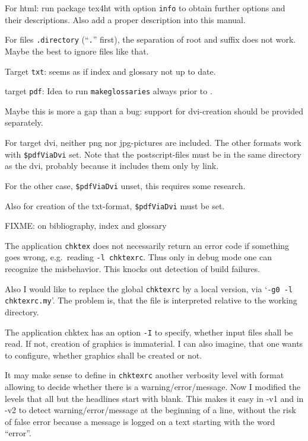 For html: run package tex4ht with option \texttt{info} 
to obtain further options and their descriptions. 
Also add a proper description into this manual. 

For files \texttt{.directory} (``\texttt{.}'' first), 
the separation of root and suffix does not work. 
Maybe the best to ignore files like that. 

Target \texttt{txt}: seems as if index and glossary not up to date. 

target \texttt{pdf}: Idea to run \texttt{makeglossaries} 
always prior to \lualatex. 

Maybe this is more a gap than a bug: 
support for dvi-creation should be provided separately. 

For target dvi, 
neither png nor jpg-pictures are included. 
The other formats work with \texttt{\$pdfViaDvi} set. 
Note that the postscript-files must be in the same directory 
as the dvi, probably because it includes them 
only by link. 

For the other case, \texttt{\$pdfViaDvi} unset, this requires some research. 

Also for creation of the txt-format, 
\texttt{\$pdfViaDvi} must be set. 

FIXME\@: on bibliography, index and glossary 

The application \texttt{chktex} does not necessarily return an error code 
if something goes wrong, e.g.~reading \texttt{-l chktexrc}. 
Thus only in debug mode one can recognize the misbehavior. 
This knocks out detection of build failures. 

Also I would like to replace the global \texttt{chktexrc} by a local version, 
via `\texttt{-g0 -l chktexrc.my}'. 
The problem is, 
that the file is interpreted relative to the working directory. 

The application chktex has an option \texttt{-I} to specify, 
whether input files shall be read. 
If not, creation of graphics is immaterial. 
I can also imagine, that one wants to configure, 
whether graphics shall be created or not. 

It may make sense to define in \texttt{chktexrc} another verbosity level 
with format allowing to decide whether there is a warning/error/message. 
Now I modified the levels that all but the headlines start with blank. 
This makes it easy in -v1 and in -v2 to detect warning/error/message 
at the beginning of a line, 
without the risk of false error because a message is logged 
on a text starting with the word ``error''. 


